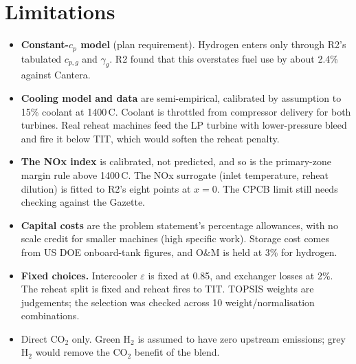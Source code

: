 \documentclass[10.5pt,a4paper]{article}
\begin{document}
\section{Limitations}\label{sec:lim}
\begin{itemize}[leftmargin=1.2em,itemsep=1pt]
\item \textbf{Constant-$c_p$ model} (plan requirement). Hydrogen enters only through R2's tabulated $c_{p,g}$ and $\gamma_g$. R2 found that this overstates fuel use by about 2.4\% against Cantera.
\item \textbf{Cooling model and data} are semi-empirical, calibrated by assumption to 15\% coolant at 1400\,\textdegree C. Coolant is throttled from compressor delivery for both turbines. Real reheat machines feed the LP turbine with lower-pressure bleed and fire it below TIT, which would soften the reheat penalty.
\item \textbf{The NOx index} is calibrated, not predicted, and so is the primary-zone margin rule above 1400\,\textdegree C. The NOx surrogate (inlet temperature, reheat dilution) is fitted to R2's eight points at $x=0$. The CPCB limit still needs checking against the Gazette.
\item \textbf{Capital costs} are the problem statement's percentage allowances, with no scale credit for smaller machines (high specific work). Storage cost comes from US DOE onboard-tank figures, and O\&M is held at 3\% for hydrogen.
\item \textbf{Fixed choices.} Intercooler $\varepsilon$ is fixed at 0.85, and exchanger losses at 2\%. The reheat split is fixed and reheat fires to TIT. TOPSIS weights are judgements; the selection was checked across 10 weight/normalisation combinations.
\item Direct CO$_2$ only. Green H$_2$ is assumed to have zero upstream emissions; grey H$_2$ would remove the CO$_2$ benefit of the blend.
\end{itemize}

\end{document}
